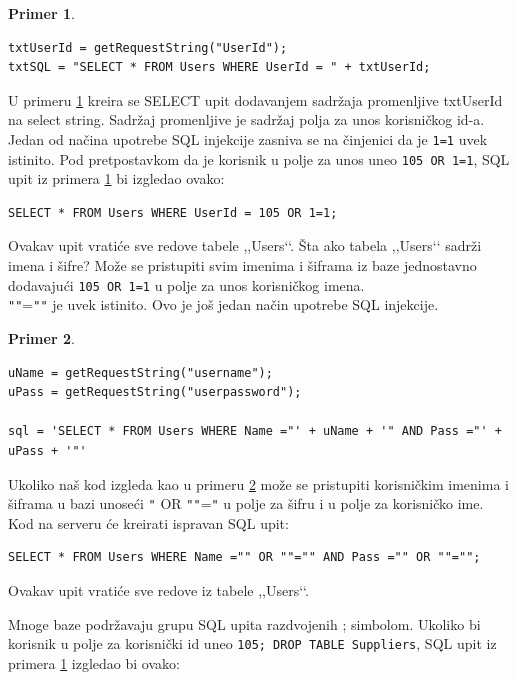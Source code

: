 \documentclass[a4paper]{article}
\theoremstyle{break}
\newtheorem{primer}{Primer}[subsection]
\begin{document}
{\begin{primer}
\label{primer_1}
\begin{lstlisting}[frame=single]
txtUserId = getRequestString("UserId");
txtSQL = "SELECT * FROM Users WHERE UserId = " + txtUserId;
\end{lstlisting}
\end{primer}
\noindent U primeru \ref{primer_1} kreira se SELECT upit dodavanjem sadržaja promenljive txtUserId na select string. Sadržaj promenljive je sadržaj polja za unos korisničkog id-a.\\

Jedan od načina upotrebe SQL injekcije zasniva se na činjenici da je \texttt{1=1} uvek istinito. Pod pretpostavkom da je korisnik u polje za unos uneo \texttt{105 OR 1=1}, SQL upit iz primera \ref{primer_1} bi izgledao ovako:

\begin{lstlisting}[frame=single]
SELECT * FROM Users WHERE UserId = 105 OR 1=1;
\end{lstlisting}
\noindent Ovakav upit vratiće sve redove tabele ,,Users‘‘. Šta ako tabela ,,Users‘‘ sadrži imena i šifre? Može se pristupiti svim imenima i šiframa iz baze jednostavno dodavajući \texttt{105 OR 1=1} u polje za unos korisničkog imena.\\

\texttt{"}\texttt{"}=\texttt{"}\texttt{"} je uvek istinito. Ovo je još jedan način upotrebe SQL injekcije.
\begin{primer}
\label{primer_2}
\begin{lstlisting}[frame=single]
uName = getRequestString("username");
uPass = getRequestString("userpassword");

sql = 'SELECT * FROM Users WHERE Name ="' + uName + '" AND Pass ="' + uPass + '"'
\end{lstlisting}
\end{primer}

\noindent Ukoliko naš kod izgleda kao u primeru \ref{primer_2} može se pristupiti korisničkim imenima i šiframa u bazi unoseći \texttt{"} OR \texttt{"}\texttt{"}=\texttt{"} u polje za šifru i u polje za korisničko ime. Kod na serveru će kreirati ispravan SQL upit:

\begin{lstlisting}[frame=single]
SELECT * FROM Users WHERE Name ="" OR ""="" AND Pass ="" OR ""="";
\end{lstlisting}
\noindent Ovakav upit vratiće sve redove iz tabele ,,Users‘‘. 

Mnoge baze podržavaju grupu SQL upita razdvojenih ; simbolom. Ukoliko bi korisnik u polje za korisnički id uneo \texttt{105; DROP TABLE Suppliers}, SQL upit iz primera \ref{primer_1} izgledao bi ovako:

}
\end{document}
